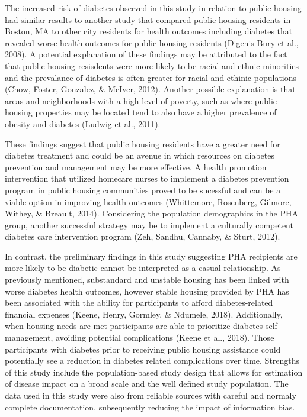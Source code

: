 \documentclass [11pt, proquest] {uwthesis}[2015/03/03]
\begin{document}
The increased risk of diabetes observed in this study in relation to
public housing had similar results to another study that compared public
housing residents in Boston, MA to other city residents for health
outcomes including diabetes that revealed worse health outcomes for
public housing residents (Digenis-Bury et al., 2008). A potential
explanation of these findings may be attributed to the fact that public
housing resisdents were more likely to be racial and ethnic minorities
and the prevalance of diabetes is often greater for racial and ethinic
populations (Chow, Foster, Gonzalez, \& McIver, 2012). Another possible
explanation is that areas and neighborhoods with a high level of
poverty, such as where public housing properties may be located tend to
also have a higher prevalence of obesity and diabetes (Ludwig et al.,
2011).

These findings suggest that public housing residents have a greater need
for diabetes treatment and could be an avenue in which resources on
diabetes prevention and management may be more effective. A health
promotion intervention that utilized homecare nurses to implement a
diabetes prevention program in public housing communities proved to be
sucessful and can be a viable option in improving health outcomes
(Whittemore, Rosenberg, Gilmore, Withey, \& Breault, 2014). Considering
the population demographics in the PHA group, another successful
strategy may be to implement a culturally competent diabetes care
intervention program (Zeh, Sandhu, Cannaby, \& Sturt, 2012).

In contrast, the preliminary findings in this study suggesting PHA
recipients are more likely to be diabetic cannot be interpreted as a
casual relationship. As previously mentioned, substandard and unstable
housing has been linked with worse diabetes health outcomes, however
stable housing provided by PHA has been associated with the ability for
participants to afford diabetes-related financial expenses (Keene,
Henry, Gormley, \& Ndumele, 2018). Additionally, when housing needs are
met participants are able to prioritize diabetes self-management,
avoiding potential complications (Keene et al., 2018). Those
participants with diabetes prior to receiving public housing assistance
could potentially see a reduction in diabetes related complications over
time. Strengths of this study include the population-based study design
that allows for estimation of disease impact on a broad scale and the
well defined study population. The data used in this study were also
from reliable sources with careful and normaly complete documentation,
subsequently reducing the impact of information bias.
\end{document}
